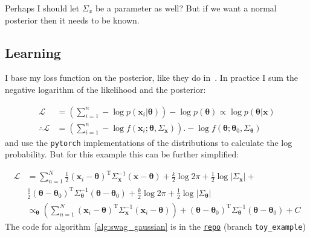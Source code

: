 Perhaps I should let $\Sigma_x$ be a parameter as well? But if we want a normal posterior then it needs to be known.

\subsection{Learning}

I base my loss function on the posterior, like they do in\ \cite{swag}. In practice I sum the negative logarithm of the likelihood and the posterior:

\begin{align}
  \mathcal{L} &=
    \left( \displaystyle{\sum_{i=1}^n} - \log p( \bm{x}_i | \bm{\theta} ) \right)
    - \log p( \bm{\theta} ) \propto \log p( \bm{\theta} | \bm{x} )
    \nonumber \\
  \therefore \mathcal{L} &=
    \left( \displaystyle{\sum_{i=1}^n} - \log f( \bm{x}_i; \bm{\theta}, \Sigma_{\bm{x}} ) \right).
    - \log f( \bm{\theta}; \bm{\theta}_0, \Sigma_{\bm{\theta}} )
\end{align}
and use the \texttt{pytorch} implementations of the distributions to calculate the log probability.
But for this example this can be further simplified:

\begin{align}
  \mathcal{L} &= 
              \sum_{n=1}^N \frac{ 1 }{ 2 } ( \bm {x}_i - \bm{\theta} )^{ \mathrm {T} }\Sigma_{\bm{x}}^{-1} ( \bm{x} - \bm{\theta} ) + \frac{k}{2} \log 2\pi  + \frac{1}{2} \log | \Sigma_{\bm{x}} | + \nonumber \\
              &\frac{ 1 }{ 2 } ( \bm {\theta} - \bm{\theta}_0 )^{ \mathrm {T} }\Sigma_{\bm{\theta}}^{-1} ( \bm{\theta} - \bm{\theta}_0 ) + \frac{k}{2} \log 2\pi  + \frac{1}{2} \log | \Sigma_{\bm{\theta}} | \nonumber \\
              &\propto_{\bm{\theta}}
              \left( \sum_{n=1}^N( \bm {x}_i - \bm{\theta} )^{ \mathrm {T} }\Sigma_{\bm{x}}^{-1} ( \bm{x}_i - \bm{\theta} ) \right) +
              ( \bm {\theta} - \bm{\theta}_0 )^{ \mathrm {T} }\Sigma_{\bm{\theta}}^{-1} ( \bm{\theta} - \bm{\theta}_0 ) + C
\end{align}
The code for algorithm~\ref{alg:swag_gaussian} is in the
\href{https://github.com/probabilisticdeeplearning/swa_gaussian/tree/toy_example}{\texttt{repo}} (branch \texttt{toy\_example})

